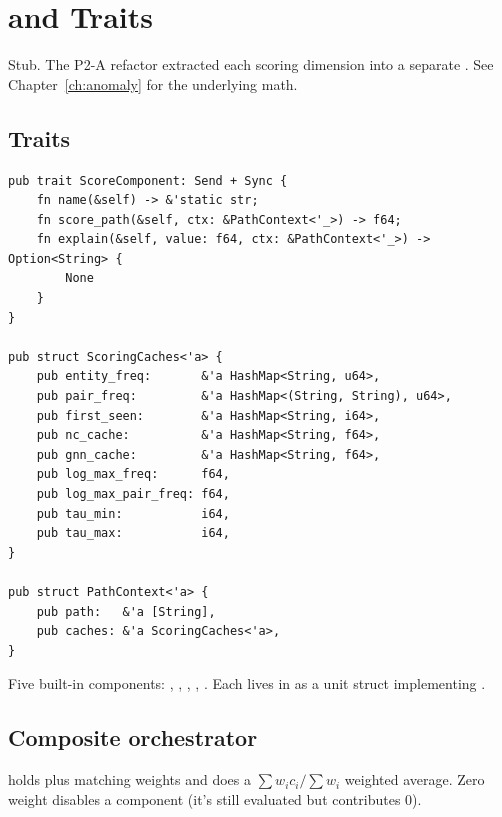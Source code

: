 \chapter{ and  Traits}
\label{ch:scorer-traits}

\begin{note}
Stub. The P2-A refactor extracted each scoring dimension into a
separate . See Chapter~\ref{ch:anomaly}
for the underlying math.
\end{note}

\section{Traits}

\begin{lstlisting}[style=rust]
pub trait ScoreComponent: Send + Sync {
    fn name(&self) -> &'static str;
    fn score_path(&self, ctx: &PathContext<'_>) -> f64;
    fn explain(&self, value: f64, ctx: &PathContext<'_>) -> Option<String> {
        None
    }
}

pub struct ScoringCaches<'a> {
    pub entity_freq:       &'a HashMap<String, u64>,
    pub pair_freq:         &'a HashMap<(String, String), u64>,
    pub first_seen:        &'a HashMap<String, i64>,
    pub nc_cache:          &'a HashMap<String, f64>,
    pub gnn_cache:         &'a HashMap<String, f64>,
    pub log_max_freq:      f64,
    pub log_max_pair_freq: f64,
    pub tau_min:           i64,
    pub tau_max:           i64,
}

pub struct PathContext<'a> {
    pub path:   &'a [String],
    pub caches: &'a ScoringCaches<'a>,
}
\end{lstlisting}

Five built-in components: , ,
, ,
. Each lives in
 as a unit
struct implementing .

\section{Composite orchestrator}

 holds 
plus matching weights and does a $\sum w_i c_i / \sum w_i$
weighted average. Zero weight disables a component (it's still
evaluated but contributes 0).

